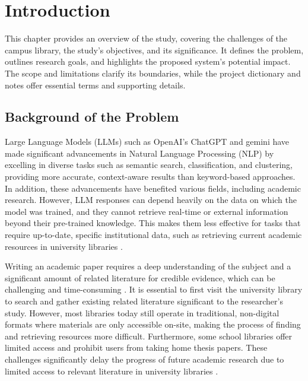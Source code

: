 
\chapter{Introduction}
\begin{refsection}

\hspace{1cm}This chapter provides an overview of the study, covering the challenges of the campus library, the study’s objectives, and its significance. It defines the problem, outlines research goals, and highlights the proposed system’s potential impact. The scope and limitations clarify its boundaries, while the project dictionary and notes offer essential terms and supporting details. 

\section{Background of the Problem}

\hspace{1cm}Large Language Models (LLMs) such as OpenAI's ChatGPT \cite{achiam2023gpt}  and gemini \cite{lee2025gemini} have made significant advancements in Natural Language Processing (NLP) by excelling in diverse tasks such as semantic search, classification, and clustering, providing more accurate, context-aware results than keyword-based approaches.
\cite{nijkamp2022codegen,chen2021evaluating} In addition, these advancements have benefited various fields, including academic research. However, LLM responses can depend heavily on the data on which the model was trained, and they cannot retrieve real-time or external information beyond their pre-trained knowledge. This makes them less effective for tasks that require up-to-date, specific institutional data, such as retrieving current academic resources in university libraries \cite{liu2024information}.

\bigbreak
\hspace{0.4cm}Writing an academic paper requires a deep understanding of the subject and a significant amount of related literature for credible evidence, which can be challenging and time-consuming \cite{khalifa2024using}. It is essential to first visit the university library to search and gather existing related literature significant to the researcher’s study.  However, most libraries today still operate in traditional, non-digital formats where materials are only accessible on-site, making the process of finding and retrieving resources more difficult. 
\newpage
\clearpage
Furthermore, some school libraries offer limited access and prohibit users from taking home thesis papers. These challenges significantly delay the progress of future academic research due to limited access to relevant literature in university libraries \cite{prajapat2022comparative}. 


\end{refsection}
